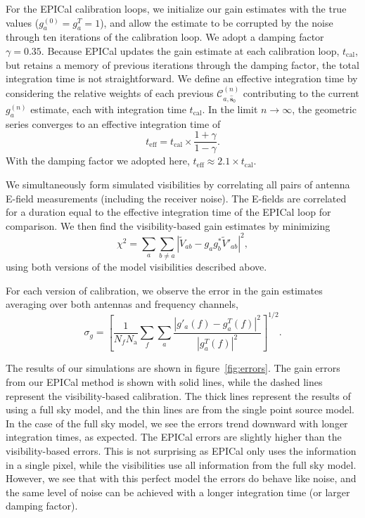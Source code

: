 \documentclass[a4paper,fleqn,usenatbib]{../mnras}
\newcommand{\Nant}{\ensuremath{N_{\mathrm{a}}}}
\newcommand{\spix}{\ensuremath{\hat{\mathbf{s}}_{0}}}
\newcommand{\Cna}[1][n]{\ensuremath{\mathcal{C}^{(#1)}_{a,\spix}}}
\newcommand{\V}{\ensuremath{\widetilde{V}}}
\newcommand{\damp}{\ensuremath{\gamma}}
\newcommand{\tcal}{\ensuremath{t_{\mathrm{cal}}}}
\newcommand{\teff}{\ensuremath{t_{\mathrm{eff}}}}
\begin{document}
For the EPICal calibration loops, we initialize our gain estimates with the true values (${g^{(0)}_a=g^T_a=1}$), and allow the estimate to be corrupted by the noise through ten iterations of the calibration loop. We adopt a damping factor $\damp=0.35$. Because EPICal updates the gain estimate at each calibration loop, \tcal, but retains a memory of previous iterations through the damping factor, the total integration time is not straightforward. We define an effective integration time by considering the relative weights of each previous $\Cna$ contributing to the current $g^{(n)}_a$ estimate, each with integration time \tcal. In the limit $n\rightarrow \infty$, the geometric series converges to an effective integration time of
\begin{equation}
\teff = \tcal \times \frac{1+\damp}{1-\damp}.
\end{equation}
With the damping factor we adopted here, $\teff \approx 2.1 \times \tcal$. 

We simultaneously form simulated visibilities by correlating all pairs of antenna E-field measurements (including the receiver noise). The E-fields are correlated for a duration equal to the effective integration time of the EPICal loop for comparison. We then find the visibility-based gain estimates by minimizing
\begin{equation}\label{eq:vis_cal}
\chi^2 = \sum_a\sum_{b\ne a} \left|\V_{ab}-g_a g_b^* \V'_{ab}\right|^2,
\end{equation}
using both versions of the model visibilities described above.

 For each version of calibration, we observe the error in the gain estimates averaging over both antennas and frequency channels,
\begin{equation}\label{eq:gain_error}
\sigma_g = \left[\frac{1}{N_f \Nant} \sum_f \sum_a \frac{\left|g'_a(f)-g^T_a(f)\right|^2}{\left|g^T_a(f)\right|^2}\right]^{1/2}.
\end{equation}

The results of our simulations are shown in figure~\ref{fig:errors}. The gain errors from our EPICal method is shown with solid lines, while the dashed lines represent the visibility-based calibration. The thick lines represent the results of using a full sky model, and the thin lines are from the single point source model.  In the case of the full sky model, we see the errors trend downward with longer integration times, as expected. The EPICal errors are slightly higher than the visibility-based errors. This is not surprising as EPICal only uses the information in a single pixel, while the visibilities use all information from the full sky model. However, we see that with this perfect model the errors do behave like noise, and the same level of noise can be achieved with a longer integration time (or larger damping factor).
\end{document}
